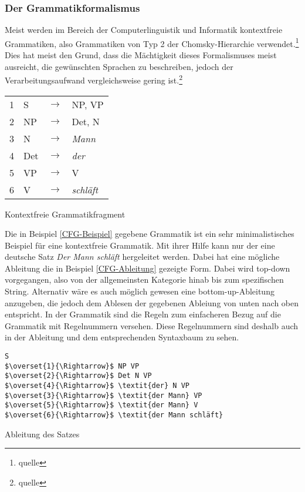 \documentclass[11pt]{scrartcl}
\begin{document}
\subsubsection{Der Grammatikformalismus}
Meist werden im Bereich der Computerlinguistik und Informatik kontextfreie Grammatiken, also Grammatiken von Typ 2 der Chomsky-Hierarchie verwendet.\footnote{quelle} Dies hat meist den Grund, dass die Mächtigkeit dieses Formalismuses meist ausreicht, die gewünschten Sprachen zu beschreiben, jedoch der Verarbeitungsaufwand vergleichsweise gering ist.\footnote{quelle}
\begin{program}[h]
\begin{tabular}{llll}
1 & S & $\longrightarrow$ & NP, VP \\
2 & NP & $\longrightarrow$ & Det, N \\
3 & N & $\longrightarrow$ & \textit{Mann} \\
4 & Det & $\longrightarrow$ & \textit{der} \\
5 & VP & $\longrightarrow$ & V \\
6 & V  & $\longrightarrow$ & \textit{schläft} \\
\end{tabular}
\caption{Kontextfreie Grammatikfragment}
\label{CFG-Beispiel}
\end{program}
Die in Beispiel \ref{CFG-Beispiel} gegebene Grammatik ist ein sehr minimalistisches Beispiel für eine kontextfreie Grammatik. Mit ihrer Hilfe kann nur der eine deutsche Satz \textit{Der Mann schläft} hergeleitet werden. Dabei hat eine mögliche Ableitung die in Beispiel \ref{CFG-Ableitung} gezeigte Form. Dabei wird top-down vorgegangen, also von der allgemeinsten Kategorie hinab bis zum spezifischen String. Alternativ wäre es auch möglich gewesen eine bottom-up-Ableitung anzugeben, die jedoch dem Ablesen der gegebenen Ableiung von unten nach oben entspricht. In der Grammatik sind die Regeln zum einfacheren Bezug auf die Grammatik mit Regelnummern versehen. Diese Regelnummern sind deshalb auch in der Ableitung und dem entsprechenden Syntaxbaum zu sehen.
\\
\begin{program}[h]
\begin{Verbatim}[commandchars=\\\{\},codes={\catcode`$=3\catcode`^=7}] 
S
$\overset{1}{\Rightarrow}$ NP VP
$\overset{2}{\Rightarrow}$ Det N VP
$\overset{4}{\Rightarrow}$ \textit{der} N VP
$\overset{3}{\Rightarrow}$ \textit{der Mann} VP
$\overset{5}{\Rightarrow}$ \textit{der Mann} V
$\overset{6}{\Rightarrow}$ \textit{der Mann schläft}
\end{Verbatim}
\caption{Ableitung des Satzes}
\label{CFG-Ableitung}
\end{program}
\end{document}

